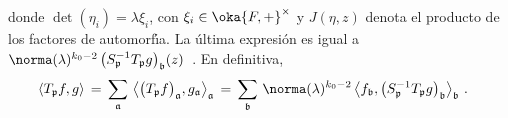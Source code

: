 %
donde $\det(\eta_{i})=\lambda\xi_{i}$, con $\xi_{i}\in\oka{F,+}^{\times}$ y
$J(\eta,z)$ denota el producto de los factores de automorf\'{\i}a. La
\'{u}ltima expresi\'{o}n es igual a
\begin{math}
	\norma(\lambda)^{k_{0}-2}\,\big(S_{\frak{p}}^{-1}T_{\frak{p}}g
		\big)_{\frak{b}}(z)
\end{math}~.
En definitiva,
\begin{align*}
	\langle T_{\frak{p}}f,g\rangle & \,=\,\sum_{\frak{a}}\,
		\big\langle \big(T_{\frak{p}}f\big)_{\frak{a}},g_{\frak{a}}
			\big\rangle_{\frak{a}} \,=\,
		\sum_{\frak{b}}\,\norma(\lambda)^{k_{0}-2}\,
		\big\langle f_{\frak{b}},\big(S_{\frak{p}}^{-1}T_{\frak{p}}g
			\big)_{\frak{b}}
			\big\rangle_{\frak{b}}
	\text{ .}
\end{align*}
%
